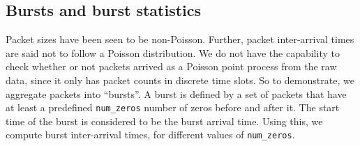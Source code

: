 \documentclass[11pt, twoside]{article}
\begin{document}
\subsection{Bursts and burst statistics}

Packet sizes have been seen to be non-Poisson. Further, packet inter-arrival times are said not to follow a Poisson distribution. We do not have the capability to check whether or not packets arrived as a Poisson point process from the raw data, since it only has packet counts in discrete time slots. So to demonstrate, we aggregate packets into ``bursts''. A burst is defined by a set of packets that have at least a predefined \verb+num_zeros+ number of zeros before and after it. The start time of the burst is considered to be the burst arrival time. Using this, we compute burst inter-arrival times, for different values of \verb+num_zeros+.
\end{document}

